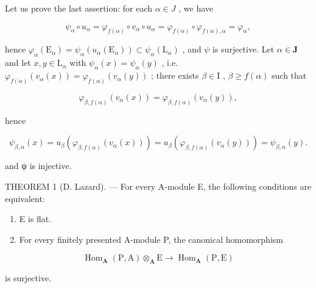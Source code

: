 Let us prove the last assertion: for each \(\alpha \in J\) , we have

\[
\psi_ {\alpha} \circ u _ {\alpha} = \varphi_ {f (\alpha)} \circ v _ {\alpha} \circ u _ {\alpha} = \varphi_ {f (\alpha)} \circ \varphi_ {f (\alpha), \alpha} = \varphi_ {\alpha},
\]

hence \(\varphi_{\alpha}(\mathrm{E}_{\alpha}) = \psi_{\alpha}(u_{\alpha}(\mathrm{E}_{\alpha})) \subset \psi_{\alpha}(\mathrm{L}_{\alpha})\) , and \(\psi\) is surjective. Let \(\alpha \in \mathbf{J}\) and let \(x, y \in \mathrm{L}_{\alpha}\) with \(\psi_{\alpha}(x) = \psi_{\alpha}(y)\) , i.e. \(\varphi_{f(\alpha)}(v_{\alpha}(x)) = \varphi_{f(\alpha)}(v_{\alpha}(y))\) ; there exists \(\beta \in \mathrm{I}\) , \(\beta \geqslant f(\alpha)\) such that

\[
\varphi_ {\beta , f (\alpha)} (v _ {\alpha} (x)) = \varphi_ {\beta , f (\alpha)} (v _ {\alpha} (y)),
\]

hence

\[
\psi_ {\beta , \alpha} (x) = u _ {\beta} (\varphi_ {\beta , f (\alpha)} (v _ {\alpha} (x))) = u _ {\beta} (\varphi_ {\beta , f (\alpha)} (v _ {\alpha} (y))) = \psi_ {\beta , \alpha} (y).
\]

and ψ is injective.

THEOREM 1 (D. Lazard). --- For every A-module E, the following conditions are equivalent:

\begin{enumerate}
\def\labelenumi{(\roman{enumi})}
\item
  E is flat.
\item
  For every finitely presented A-module P, the canonical homomorphism
\end{enumerate}

\[
\operatorname{Hom} _ {\mathbf {A}} (\mathrm{P}, \mathrm{A}) \otimes_ {\mathbf {A}} \mathrm{E} \rightarrow \operatorname{Hom} _ {\mathbf {A}} (\mathrm{P}, \mathrm{E})
\]

is surjective.

